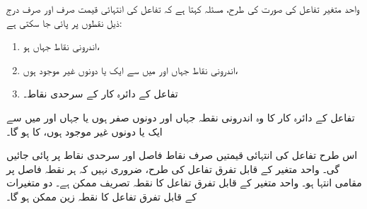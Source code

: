 واحد متغیر تفاعل کی صورت کی  طرح، مسئلہ  کہتا ہے کہ تفاعل  کی  انتہائی قیمت صرف اور صرف   درج ذیل  نقطوں پر پائی جا سکتی ہے:
\begin{enumerate}[1.]
\item
اندرونی نقاط جہاں  ہو،
\item
اندرونی نقاط جہاں  اور  میں سے ایک یا دونوں غیر موجود ہوں،
\item
تفاعل کے دائرہ کار کے سرحدی نقاط۔
\end{enumerate}

تفاعل  کے دائرہ کار  کا     وہ اندرونی نقطہ  جہاں  اور  دونوں  صفر ہوں یا جہاں     اور میں سے ایک یا  دونوں غیر موجود ہوں،  کا  ہو گا۔

اس طرح تفاعل   کی انتہائی قیمتیں صرف  نقاط فاصل اور سرحدی نقاط  پر پائی جائیں گی۔ واحد متغیر  کے قابل تفرق تفاعل کی طرح، ضروری نہیں کہ ہر نقطہ فاصل پر مقامی انتہا   ہو۔ واحد متغیر کے قابل تفرق تفاعل کا نقطہ تصریف  ممکن ہے۔ دو متغیرات کے قابل تفرق تفاعل  کا نقطہ زین ممکن ہو گا۔  

